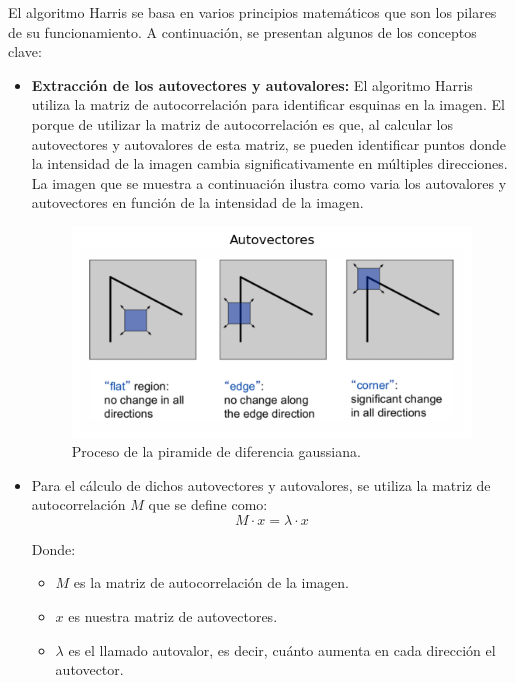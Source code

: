 \documentclass[a4paper]{article}
\begin{document}
  El algoritmo Harris se basa en varios principios matemáticos que son los pilares de su funcionamiento.
   A continuación, se presentan algunos de los conceptos clave:
  
  \begin{itemize}
      \item \textbf{Extracción de los autovectores y autovalores:}  
      El algoritmo Harris utiliza la matriz de autocorrelación para identificar esquinas en la imagen. El porque 
      de utilizar la matriz de autocorrelación es que, al calcular los autovectores y autovalores de esta matriz, se pueden identificar puntos donde la intensidad de la imagen cambia significativamente en múltiples direcciones.
      La imagen que se muestra a continuación ilustra como varia los autovalores y autovectores en función de la intensidad de la imagen.
      \begin{figure}[H]
        \centering
        \includegraphics[width=1.1\textwidth]{images/harris_autovectores.png}
        \caption{Proceso de la piramide de diferencia gaussiana.}
        
    \end{figure}
      
    \item Para el cálculo de dichos autovectores y autovalores, se utiliza la matriz de autocorrelación \(M\) que se define como:
    \[
        M \cdot x = \lambda \cdot x
    \]
    
    Donde:
    \begin{itemize}
        \item \(M\) es la matriz de autocorrelación de la imagen.
        \item \(x\) es nuestra matriz de autovectores.
        \item \(\lambda\) es el llamado autovalor, es decir, cuánto aumenta en cada dirección el autovector.
    \end{itemize}


\end{itemize}
\end{document}
